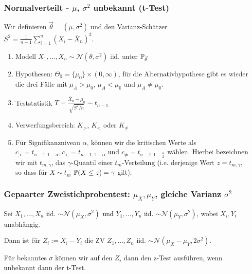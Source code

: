 \subsubsection*{\texorpdfstring{Normalverteilt - \(\mu\), \(\sigma^2\) unbekannt (t-Test)}{Normalverteilt - μ, σ² unbekannt (t-Test)}}
Wir definieren \(\vec{\theta} = (\mu, \sigma^2)\) und den Varianz-Schätzer \(S^2 = \frac{1}{n-1}\sum_{i=1}^n (X_i - \overline{X}_n)^2\).
\begin{enumerate}
	\item Modell \(X_1, \ldots, X_n \sim \mathcal{N}(\theta, \sigma^2)\) iid. unter \(\P_{\vec{\theta}}\)
	\item Hypothesen: $\Theta_0 = \{\mu_0\} \times (0, \infty)$, für die Alternativhypothese gibt es wieder die drei Fälle mit $\mu_A > \mu_0$, $\mu_A < \mu_0$ und $\mu_A \neq \mu_0$.
	\item Teststatistik \(T = \frac{\overline{X}_n - \mu_0}{\sqrt{S^2/n}} \sim t_{n-1}\)
	\item Verwerfungsbereich: \(K_{>}\), \(K_{<}\) oder \(K_{\neq}\)
	\item Für Signifikanzniveau $\alpha$, können wir die kritischen Werte als $c_{>} = t_{n-1, 1-\alpha}, c_{<} = t_{n-1, 1- \alpha}$ und $c_{\neq} = t_{n-1, 1- \frac{\alpha}{2}}$ wählen.
	Hierbei bezeichnen wir mit $t_{m, \gamma}$, das $\gamma$-Quantil einer $t_m$-Verteilung (i.e. derjenige Wert $z = t_{m, \gamma}$, so dass für $X \sim t_m$ $\P(X \leq z) = \gamma$ gilt).
\end{enumerate}
\subsubsection*{Gepaarter Zweistichprobentest: $\mu_X, \mu_Y$, gleiche Varianz $\sigma^2$}
Sei $X_1, ..., X_n$ iid. $\sim \mathcal{N}(\mu_X, \sigma^2)$ und $Y_1, \dots, Y_n$ iid. $\sim \mathcal{N}(\mu_Y, \sigma^2)$, wobei $X_i, Y_i$ unabhängig.

Dann ist für $Z_i := X_i - Y_i$ die ZV $Z_1, \dots, Z_n$ iid. $\sim \mathcal{N}(\mu_X -\mu_Y, 2\sigma^2)$. 

Für bekanntes $\sigma$ können wir auf den $Z_i$ dann den z-Test ausführen, wenn unbekannt dann der t-Test.
